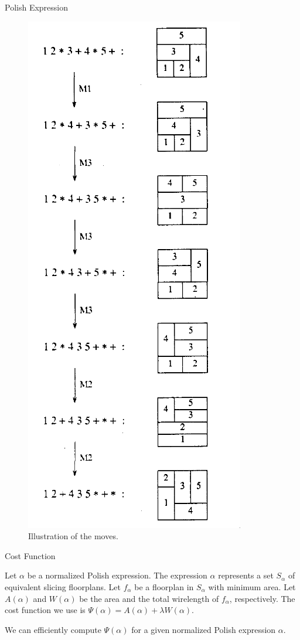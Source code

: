 \documentclass[xcolor=pdftex,dvipsnames,table]{beamer}
\begin{document}
\begin{frame}{Polish Expression}
  \begin{figure}
    \includegraphics[scale=0.3]{moves}
    \caption{Illustration of the moves.}
    \label{fig:4}
  \end{figure}
\end{frame}

\begin{frame}{Cost Function}
  \begin{block}{}
    Let $\alpha$ be a normalized Polish expression. The expression $\alpha$ represents a set $S_\alpha$ of equivalent slicing floorplans. Let $f_\alpha$ be a floorplan in $S_\alpha$ with minimum area. Let $A(\alpha)$ and $W(\alpha)$ be the area and the total wirelength of $f_\alpha$, respectively. The cost function we use is $\Psi(\alpha) = A(\alpha) + \lambda W(\alpha)$.
  \end{block}

  We can efficiently compute $\Psi(\alpha)$ for a given normalized Polish expression $\alpha$.
\end{frame}
\end{document}
